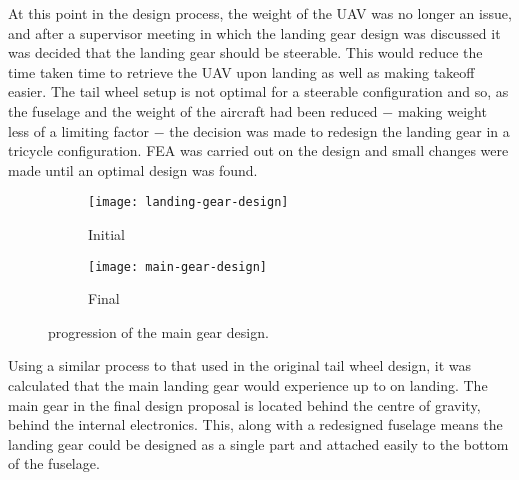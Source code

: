 \documentclass[../../main.tex]{subfiles}
\begin{document}

At this point in the design process, the weight of the UAV was no longer an issue, and after a supervisor meeting in which the landing gear design was discussed it was decided that the landing gear should be steerable.
This would reduce the time taken time to retrieve the UAV upon landing as well as making takeoff easier.
The tail wheel setup is not optimal for a steerable configuration and so, as the fuselage and the weight of the aircraft had been reduced $-$ making weight less of a limiting factor $-$ the decision was made to redesign the landing gear in a tricycle configuration. 
FEA was carried out on the design and small changes were made until an optimal design was found.

\begin{figure}[H]
    \centering
    \begin{subfigure}[b]{0.33\columnwidth}
        \centering
        \texttt{[image: landing-gear-design]}
        \caption{Initial}
        \label{fig:main-gear-progression:initial}
    \end{subfigure}
    \hfill
    \begin{subfigure}[b]{0.49\columnwidth}
        \centering
        \texttt{[image: main-gear-design]}
        \caption{Final}
        \label{fig:main-gear-progression:final}
    \end{subfigure}
    
    \caption{progression of the main gear design.}
    \label{fig:main-gear-progression}
\end{figure}


Using a similar process to that used in the original tail wheel design, it was calculated that the main landing gear would experience up to  on landing.  %
The main gear in the final design proposal is located behind the centre of gravity, behind the internal electronics.
This, along with a redesigned fuselage means the landing gear could be designed as a single part and attached easily to the bottom of the fuselage. 

\end{document}
